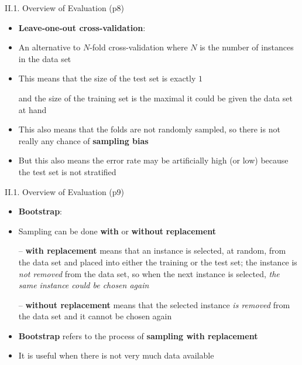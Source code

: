 \documentclass[handout]{beamer}
\newcommand{\strong}[1]{\textbf{\color{teal} #1}}
\newcommand{\stronger}[1]{\textbf{\color{purple} #1}}
\begin{document}
\begin{frame}{II.1. Overview of Evaluation (p8)}
\begin{itemize}
\item \stronger{Leave-one-out cross-validation}:
\item[]
\item An alternative to $N$-fold cross-validation where $N$ is the number of instances in the data set
\item This means that the size of the test set is exactly $1$
\item[] and the size of the training set is the maximal it could be given the data set at hand
\item This also means that the folds are not randomly sampled, so there is not really any chance of \strong{sampling bias}
\item But this also means the error rate may be artificially high (or low) because the test set is not stratified
\end{itemize}
\end{frame}
\begin{frame}{II.1. Overview of Evaluation (p9)}
\begin{itemize}
\item \stronger{Bootstrap}:
\item[]
\item Sampling can be done \strong{with} or \strong{without} \strong{replacement}
\item[--] \strong{with replacement} means that an instance is selected, at random, from the data set and placed into either the training or the test set; the instance is \emph{not removed} from the data set, so when the next instance is selected, \emph{the same instance could be chosen again}
\item[--] \strong{without replacement} means that the selected instance \emph{is removed} from the data set and it cannot be chosen again
\item[]
\item \stronger{Bootstrap} refers to the process of \stronger{sampling with replacement}
\item It is useful when there is not very much data available
\end{itemize}
\end{frame}
\end{document}
